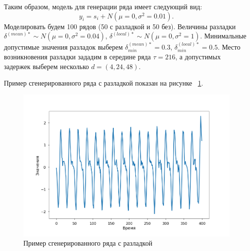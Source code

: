 \documentclass[%
12pt,
master,  %
natbib,      %
subf,        %
substylefile = spbu.rtx,
href,        %
colorlinks,  %
]{disser}
\begin{document}
Таким образом, модель для генерации ряда имеет следующий вид:
\begin{equation*} y_i = s_i + N(\mu = 0, \sigma^2 = 0.01).\end{equation*}
Моделировать будем 100 рядов (50 с разладкой и 50 без). Величины разладки $\delta^{(mean)*} \sim N(\mu = 0,\sigma^2 = 0.04)$, $\delta^{(local)*} \sim N(\mu = 0,\sigma^2 = 1)$. Минимальные допустимые значения разладок выберем $\delta^{(mean)*}_{min} = 0.3$, $\delta^{(local)*}_{min} = 0.5$. Место возникновения разладки зададим в середине ряда $\tau = 216$, а допустимых задержек выберем несколько $d = (4, 24, 48)$.

Пример сгенерированного ряда с разладкой показан на рисунке ~\ref{fig:data_modeling_example_2}.

\begin{figure}[!hhh]
	\begin{center}
		\includegraphics[width=12cm]{data_modeling_example_2}
	\end{center}
	\vspace{-5mm}\caption{Пример сгенерированного ряда с разладкой}
	\label{fig:data_modeling_example_2}
\end{figure}

%
%
\end{document}
